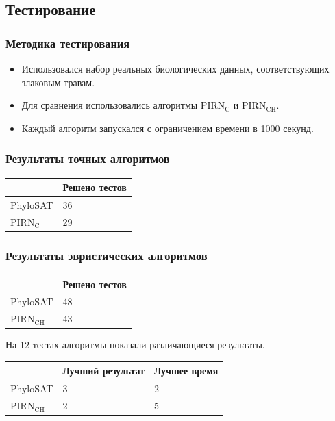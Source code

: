 \documentclass[hyperref={unicode}]{beamer}
\begin{document}
\subsection{Тестирование}

\begin{frame}
\frametitle{Методика тестирования}

\begin{itemize}
	\item Использовался набор реальных биологических данных, соответствующих злаковым травам.
	\item Для сравнения использовались алгоритмы $\mathrm{PIRN_C}$ и $\mathrm{PIRN_{CH}}$.
	\item Каждый алгоритм запускался с ограничением времени в 1000 секунд.
\end{itemize}

\end{frame}

\begin{frame}
\frametitle{Результаты точных алгоритмов}

\begin{table}
\begin{tabular}{l | l}
	& Решено тестов \\
	\hline
	PhyloSAT & 36 \\
	PIRN$\mathrm{_C}$ & 29 \\
\end{tabular}
\end{table}

\end{frame}

\begin{frame}
\frametitle{Результаты эвристических алгоритмов}

\begin{table}
\begin{tabular}{l | l}
	& Решено тестов \\
	\hline
	PhyloSAT & 48 \\
	PIRN$\mathrm{_{CH}}$ & 43 \\
\end{tabular}
\end{table}

На 12 тестах алгоритмы показали различающиеся результаты.

\begin{table}
\begin{tabular}{l | l | l}
	& Лучший результат & Лучшее время \\
	\hline
	PhyloSAT & 3 & 2 \\
	PIRN$\mathrm{_{CH}}$ & 2 & 5 \\
\end{tabular}
\end{table}

\end{frame}
\end{document}
